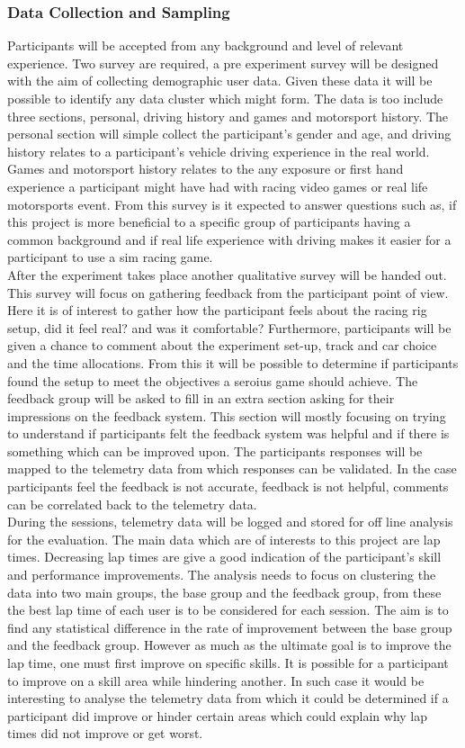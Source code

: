 \subsubsection{Data Collection and Sampling}
	Participants will be accepted from any background and level of relevant experience. Two survey are required,  a pre experiment survey will be designed with the aim of collecting demographic user data. Given these data it will be possible to identify any data cluster which might form. The data is too include three sections, personal, driving history and games and motorsport history. The personal section will simple collect the participant's gender and age, and driving history relates to a participant's vehicle driving experience in the real world. Games and motorsport history relates to the any exposure or first hand experience a participant might have had with racing video games or real life motorsports event. From this survey is it expected to answer questions such as, if this project is more beneficial to a specific group of participants having a common background and if real life experience with driving makes it easier for a participant to use a sim racing game. \\
	After the experiment takes place another qualitative survey will be handed out. This survey will focus on gathering feedback from the participant point of view. Here it is of interest to gather how the participant feels about the racing rig setup, did it feel real? and was it comfortable? Furthermore, participants will be given a chance to comment about the experiment set-up, track and car choice and the time allocations. From this it will be possible to determine if participants found the setup to meet the objectives a seroius game should achieve. The feedback group will be asked to fill in an extra section asking for their impressions on the feedback system. This section will mostly focusing on trying to understand if participants felt the feedback system was helpful and if there is something which can be improved upon. The participants responses will be mapped to the telemetry data from which responses can be validated. In the case participants feel the feedback is not accurate, feedback is not helpful, comments can be correlated back to the telemetry data.\\
	During the sessions, telemetry data will be logged and stored for off line analysis for the evaluation. The main data which are of interests to this project are lap times. Decreasing lap times are give a good indication of the participant's skill and performance improvements. The analysis needs to focus on clustering the data into two main groups, the base group and the feedback group, from these the best lap time of each user is to be considered for each session. The aim is to find any statistical difference in the rate of improvement between the base group and the feedback group. However as much as the ultimate goal is to improve the lap time, one must first improve on specific skills. It is possible for a participant to improve on a skill area while hindering another. In such case it would be interesting to analyse the telemetry data from which it could be determined if a participant did improve or hinder certain areas which could explain why lap times did not improve or get worst.
